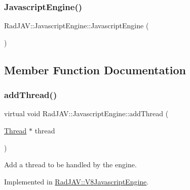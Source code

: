 \subsubsection{\texorpdfstring{Javascript\+Engine()}{JavascriptEngine()}}
{\footnotesize\ttfamily Rad\+J\+A\+V\+::\+Javascript\+Engine\+::\+Javascript\+Engine (\begin{DoxyParamCaption}{ }\end{DoxyParamCaption})\hspace{0.3cm}{\ttfamily [inline]}}



\subsection{Member Function Documentation}
\mbox{\label{class_rad_j_a_v_1_1_javascript_engine_abfbd3bff5d4eb0e36d3d18347495bbd7}} 
\subsubsection{\texorpdfstring{add\+Thread()}{addThread()}}
{\footnotesize\ttfamily virtual void Rad\+J\+A\+V\+::\+Javascript\+Engine\+::add\+Thread (\begin{DoxyParamCaption}\item[{\mbox{\hyperlink{class_rad_j_a_v_1_1_thread}{Thread}} $\ast$}]{thread }\end{DoxyParamCaption})\hspace{0.3cm}{\ttfamily [pure virtual]}}



Add a thread to be handled by the engine. 



Implemented in \mbox{\hyperlink{class_rad_j_a_v_1_1_v8_javascript_engine_ab72b1bfbf3740039b0ae00008a5e4dd3}{Rad\+J\+A\+V\+::\+V8\+Javascript\+Engine}}.

\mbox{\label{class_rad_j_a_v_1_1_javascript_engine_a91ebe8029a9658f66d9c39356eea2d80}} 
